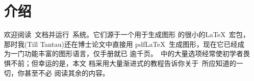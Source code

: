 %
%
%


\section{介绍}


欢迎阅读\tikzname\ 文档并运行\pgfname\ 系统。它们源于一个用于生成图形
的很小的La\TeX\ 宏包，那时我(Till Tantau)还在博士论文中直接用
pdf\LaTeX\ 生成图形，现在它已经成为一门功能丰富的图形语言，仅手册就已
逾千页。\tikzname\ 中的大量选项经常使初学者畏惧不前；但幸运的是，本文
档采用大量渐进式的教程告诉你关于\tikzname\ 所应知道的一切，你甚至不必
阅读其余的内容。


